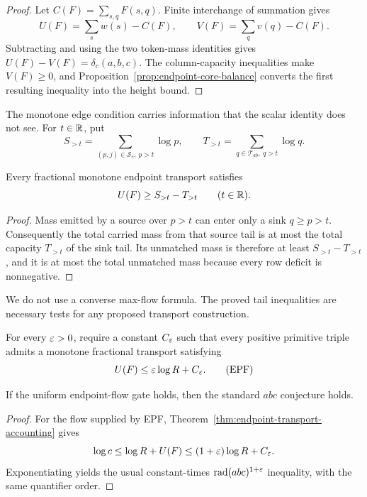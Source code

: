 \begin{proof}
Let $C(F)=\sum_{s,q}F(s,q)$.  Finite interchange of summation gives
\[
 U(F)=\sum_sw(s)-C(F),\qquad
 V(F)=\sum_qv(q)-C(F).
\]
Subtracting and using the two token-mass identities gives
$U(F)-V(F)=\delta_c(a,b,c)$.  The column-capacity inequalities make
$V(F)\ge0$, and Proposition~\ref{prop:endpoint-core-balance} converts the
first resulting inequality into the height bound.
\end{proof}

The monotone edge condition carries information that the scalar identity does
not see.  For $t\in\mathbb R$, put
\[
 S_{>t}=\sum_{(p,j)\in\mathcal S_c,\ p>t}\log p,
 \qquad T_{>t}=\sum_{q\in\mathcal T_{ab},\ q>t}\log q.
\]

\begin{theorem}
\label{thm:endpoint-hall-tail}
Every fractional monotone endpoint transport satisfies
\[
 U(F)\ge S_{>t}-T_{>t}
\qquad(t\in\mathbb R).
\]
\end{theorem}

\begin{proof}
Mass emitted by a source over $p>t$ can enter only a sink $q\ge p>t$.
Consequently the total carried mass from that source tail is at most the total
capacity $T_{>t}$ of the sink tail.  Its unmatched mass is therefore at least
$S_{>t}-T_{>t}$, and it is at most the total unmatched mass because every row
deficit is nonnegative.
\end{proof}

We do not use a converse max-flow formula.  The proved tail inequalities are
necessary tests for any proposed transport construction.

\begin{definition}
For every $\varepsilon>0$, require a constant $C_\varepsilon$ such that every positive
primitive triple admits a monotone fractional transport satisfying
\[
 U(F)\le\varepsilon\log R+C_\varepsilon.
\tag{EPF}
\]
\end{definition}

\begin{theorem}
If the uniform endpoint-flow gate holds, then the standard $abc$ conjecture
holds.
\end{theorem}

\begin{proof}
For the flow supplied by EPF,
Theorem~\ref{thm:endpoint-transport-accounting} gives
\[
 \log c\le\log R+U(F)
 \le(1+\varepsilon)\log R+C_\varepsilon.
\]
Exponentiating yields the usual constant-times
$\operatorname{rad}(abc)^{1+\varepsilon}$ inequality, with the same quantifier order.
\end{proof}


